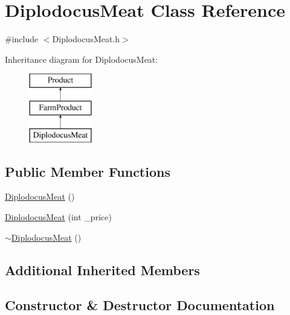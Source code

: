 \hypertarget{classDiplodocusMeat}{}\section{Diplodocus\+Meat Class Reference}
\label{classDiplodocusMeat}


{\ttfamily \#include $<$Diplodocus\+Meat.\+h$>$}

Inheritance diagram for Diplodocus\+Meat\+:\begin{figure}[H]
\begin{center}
\leavevmode
\includegraphics[height=3.000000cm]{classDiplodocusMeat}
\end{center}
\end{figure}
\subsection*{Public Member Functions}
\begin{DoxyCompactItemize}
\item 
\mbox{\hyperlink{classDiplodocusMeat_aa9042d30423b54b93413083fab91144e}{Diplodocus\+Meat}} ()
\item 
\mbox{\hyperlink{classDiplodocusMeat_afac1940976cd4b135fa616a2a667784b}{Diplodocus\+Meat}} (int \+\_\+price)
\item 
\mbox{\hyperlink{classDiplodocusMeat_a17edad25bea31e4014914578c5f1637a}{$\sim$\+Diplodocus\+Meat}} ()
\end{DoxyCompactItemize}
\subsection*{Additional Inherited Members}


\subsection{Constructor \& Destructor Documentation}
\mbox{\label{classDiplodocusMeat_aa9042d30423b54b93413083fab91144e}} 

